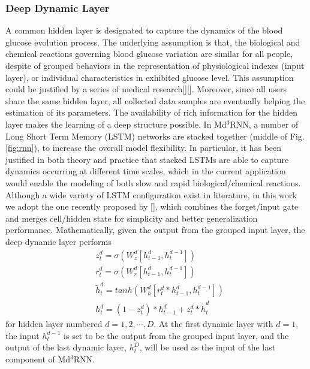 \subsubsection{Deep Dynamic Layer}
A common hidden layer is designated to capture the dynamics of the blood glucose evolution process. The underlying assumption is that, the biological and chemical reactions governing blood glucose variation are similar for all people, despite of grouped behaviors in the representation of physiological indexes (input layer), or individual characteristics in exhibited glucose level. This assumption could be justified by a series of medical research[][]. Moreover, since all users share the same hidden layer, all collected data samples are eventually helping the estimation of its parameters. The availability of rich information for the hidden layer makes the learning of a deep structure possible. In Md$^3$RNN, a number of Long Short Term Memory (LSTM) networks are stacked together (middle of Fig.\ref{fig:rnn}), to increase the overall model flexibility. In particular, it has been justified in both theory and practice that stacked LSTMs are able to capture dynamics occurring at different time scales, which in the current application would enable the modeling of both slow and rapid biological/chemical reactions. Although a wide variety of LSTM configuration exist in literature, in this work we adopt the one recently proposed by [], which combines the forget/input gate and merges cell/hidden state for simplicity and better generalization performance. Mathematically, given the output from the grouped input layer, the deep dynamic layer performs
\begin{equation}
\begin{aligned}
&z^d_t = \sigma\left( W^d_z [h_{t-1}^d,h_t^{d-1}] \right) \\
&r^d_t = \sigma\left( W^d_r [h_{t-1}^d,h_t^{d-1}] \right) \\
&\tilde{h}_t^d = tanh\left( W^d_h [r_t^d*h_{t-1}^d,h_t^{d-1}] \right) \\
&h^d_t = (1-z_t^d)*h_{t-1}^d + z_t^d*\tilde{h}_t^d
\end{aligned}
\end{equation}
for hidden layer numbered $d = 1,2,\cdots,D$. At the first dynamic layer with $d=1$, the input $h_t^{d-1}$ is set to be the output from the grouped input layer, and the output of the last dynamic layer, $h^D_t$, will be used as the input of the last component of Md$^3$RNN. 


